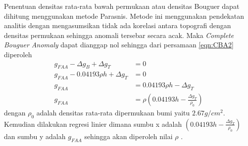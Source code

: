 Penentuan densitas rata-rata bawah permukaan atau densitas Bouguer dapat dihitung menggunakan metode Parasnis. Metode ini menggunakan pendekatan analitis dengan mengasumsikan tidak ada korelasi antara topografi dengan densitas permukaan sehingga anomali tersebar secara acak. Maka \textit{Complete Bouguer Anomaly} dapat dianggap nol  sehingga dari persamaan \ref{eqn:CBA2} diperoleh
\begin{align}
g_{FAA}-\Delta g_{B}+\Delta g_{T}&=0\\
g_{FAA}-0.04193\rho h+\Delta g_{T}&=0\\
g_{FAA}&=0.04193\rho h-\Delta g_{T}\\
g_{FAA}&=\rho \left (0.04193 h-\frac{\Delta g_{T}}{\rho_0}  \right )\label{eqn:Parasnis}
\end{align}
dengan $\rho_0$ adalah densitas rata-rata dipermukaan bumi yaitu $2.67 g/cm^2$.  Kemudian dilakukan regresi linier dimana sumbu x adalah $\left (0.04193 h-\frac{\Delta g_{T}}{\rho_0}  \right )$ dan sumbu y adalah $g_{FAA}$ sehingga akan diperoleh nilai $\rho$ \citep{Telford}.
